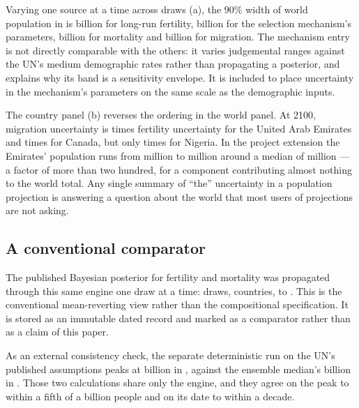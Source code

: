 Varying one source at a time across \DecompositionDraws{} draws
(a), the 90\% width of world population in
\ProjectionEndYear{} is \WidthFertility{} billion for long-run fertility,
\WidthMechanism{} billion for the selection mechanism's parameters,
\WidthMortality{} billion for mortality and \WidthMigration{} billion for
migration. The mechanism entry is not directly comparable with the others: it
varies judgemental ranges against the UN's medium demographic rates rather than
propagating a posterior, and  explains why its band is a
sensitivity envelope. It is included to place uncertainty in the mechanism's
parameters on the same scale as the demographic inputs.

The country panel (b) reverses the ordering in the world
panel. At 2100, migration uncertainty is
\MigrationOverFertilityUae{} times fertility uncertainty for the United Arab
Emirates and \MigrationOverFertilityCanada{} times for Canada, but only
\MigrationOverFertilityNigeria{} times for Nigeria. In the project extension the
Emirates' \ProjectionEndYear{} population runs from \UaeExtensionLow{} million to
\UaeExtensionHigh{} million around a median of \UaeExtensionMedian{} million ---
a factor of more than two hundred, for a component contributing almost nothing to
the world total. Any single summary of ``the'' uncertainty in a population
projection is answering a question about the world that most users of projections
are not asking.

\subsection{A conventional comparator}
\label{sec:comparator}

The published Bayesian posterior for fertility and mortality
\citep{alkema2011,raftery2012,sevcikova2016bayespop} was propagated through this
same engine one draw at a time: \ComparatorDraws{} draws,
\ComparatorCountries{} countries, to \ProjectionEndYear{}. This is the
conventional mean-reverting view rather than the compositional specification. It
is stored as an immutable dated record and marked as a comparator rather than as
a claim of this paper.

As an external consistency check, the separate deterministic run on the UN's
published assumptions peaks at
\UnEquivalentPeak{} billion in \UnEquivalentPeakYear{}, against the ensemble
median's \ComparatorPeak{} billion in \ComparatorPeakYear{}. Those two
calculations share only the engine, and they agree on the peak to within a fifth
of a billion people and on its date to within a decade.
